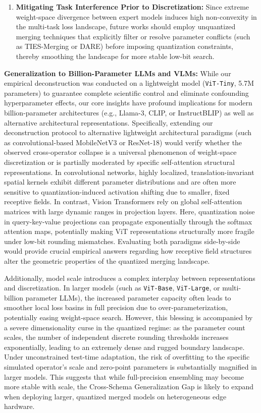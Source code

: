 \begin{enumerate}
    \item \textbf{Mitigating Task Interference Prior to Discretization:} Since extreme weight-space divergence between expert models induces high non-convexity in the multi-task loss landscape, future works should employ unquantized merging techniques that explicitly filter or resolve parameter conflicts (such as TIES-Merging or DARE) before imposing quantization constraints, thereby smoothing the landscape for more stable low-bit search.
\end{enumerate}

\textbf{Generalization to Billion-Parameter LLMs and VLMs:} While our empirical deconstruction was conducted on a lightweight model (\texttt{ViT-Tiny}, 5.7M parameters) to guarantee complete scientific control and eliminate confounding hyperparameter effects, our core insights have profound implications for modern billion-parameter architectures (e.g., Llama-3, CLIP, or InstructBLIP) as well as alternative architectural representations. Specifically, extending our deconstruction protocol to alternative lightweight architectural paradigms (such as convolutional-based MobileNetV3 or ResNet-18) would verify whether the observed cross-operator collapse is a universal phenomenon of weight-space discretization or is partially moderated by specific self-attention structural representations. In convolutional networks, highly localized, translation-invariant spatial kernels exhibit different parameter distributions and are often more sensitive to quantization-induced activation shifting due to smaller, fixed receptive fields. In contrast, Vision Transformers rely on global self-attention matrices with large dynamic ranges in projection layers. Here, quantization noise in query-key-value projections can propagate exponentially through the softmax attention maps, potentially making ViT representations structurally more fragile under low-bit rounding mismatches. Evaluating both paradigms side-by-side would provide crucial empirical answers regarding how receptive field structures alter the geometric properties of the quantized merging landscape. 

Additionally, model scale introduces a complex interplay between representations and discretization. In larger models (such as \texttt{ViT-Base}, \texttt{ViT-Large}, or multi-billion parameter LLMs), the increased parameter capacity often leads to smoother local loss basins in full precision due to over-parameterization, potentially easing weight-space search. However, this blessing is accompanied by a severe dimensionality curse in the quantized regime: as the parameter count scales, the number of independent discrete rounding thresholds increases exponentially, leading to an extremely dense and rugged boundary landscape. Under unconstrained test-time adaptation, the risk of overfitting to the specific simulated operator's scale and zero-point parameters is substantially magnified in larger models. This suggests that while full-precision ensembling may become more stable with scale, the Cross-Schema Generalization Gap is likely to expand when deploying larger, quantized merged models on heterogeneous edge hardware.

